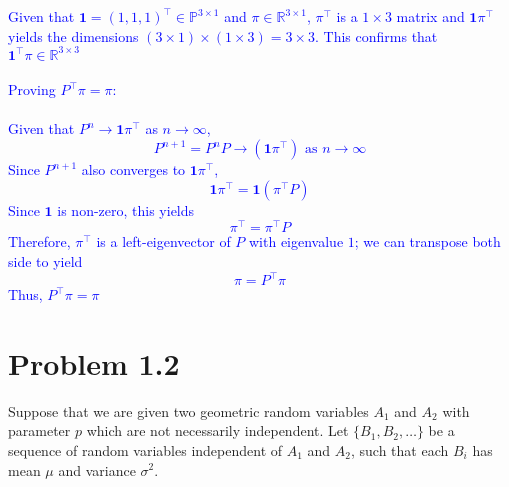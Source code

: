\documentclass{article}
\begin{document}
\begin{enumerate}[label=(\alph*)]
    \textcolor{blue}{Given that $\mathbf{1}=(1,1,1)^\top \in \mathbb{P}^{3\times 1}$ and $\pi \in \mathbb{R}^{3\times1}$, $\pi^\top$ is a $1\times 3$ matrix and $\mathbf{1}\pi^\top$ yields the dimensions $(3\times 1)\times (1\times 3)=3\times 3$. This confirms that $\mathbf{1}^\top\pi \in \mathbb{R}^{3\times 3}$ \\ \\ 
    Proving $P^\top \pi = \pi$: \\ \\
Given that $P^n \to \mathbf{1}\pi^\top$ as $n \to \infty$, $$P^{n+1}=P^n P \to (\mathbf{1}\pi^\top) \text{ as } n \to \infty$$
Since $P^{n+1}$ also converges to $\mathbf{1}\pi^\top$, $$\mathbf{1}\pi^\top = \mathbf{1}(\pi^\top P)$$
Since $\mathbf{1}$ is non-zero, this yields $$\pi^\top = \pi^\top P$$
Therefore, $\pi^\top$ is a left-eigenvector of $P$ with eigenvalue $1$; we can transpose both side to yield $$\pi=P^\top \pi$$
Thus, $P^\top \pi = \pi$}



\end{enumerate}


\section*{Problem 1.2}
Suppose that we are given two geometric random variables $A_1$ and $A_2$ with parameter $p$ which are not necessarily independent. Let $\{B_1, B_2, \dots\}$ be a sequence of random variables independent of $A_1$ and $A_2$, such that each $B_i$ has mean $\mu$ and variance $\sigma^2$.
\end{document}
